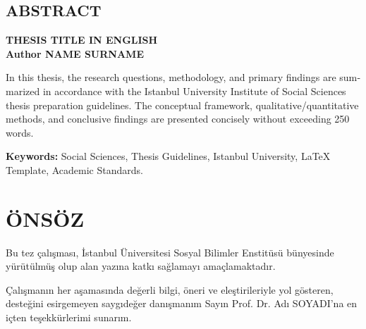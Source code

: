 \begin{otherlanguage}{english}
\chapter*{ABSTRACT}

\begin{center}
    {\bfseries\fontsize{14pt}{16pt}\selectfont THESIS TITLE IN ENGLISH}\\[0.4cm]
    {\bfseries Author NAME SURNAME}
\end{center}

\vspace{0.8cm}

In this thesis, the research questions, methodology, and primary findings are summarized in accordance with the Istanbul University Institute of Social Sciences thesis preparation guidelines. The conceptual framework, qualitative/quantitative methods, and conclusive findings are presented concisely without exceeding 250 words.

\vspace{1cm}
\noindent\textbf{Keywords:} Social Sciences, Thesis Guidelines, Istanbul University, LaTeX Template, Academic Standards.
\end{otherlanguage}

\clearpage

\chapter*{ÖNSÖZ}

Bu tez çalışması, İstanbul Üniversitesi Sosyal Bilimler Enstitüsü bünyesinde yürütülmüş olup alan yazına katkı sağlamayı amaçlamaktadır.

Çalışmanın her aşamasında değerli bilgi, öneri ve eleştirileriyle yol gösteren, desteğini esirgemeyen saygıdeğer danışmanım Sayın Prof. Dr. Adı SOYADI'na en içten teşekkürlerimi sunarım.

